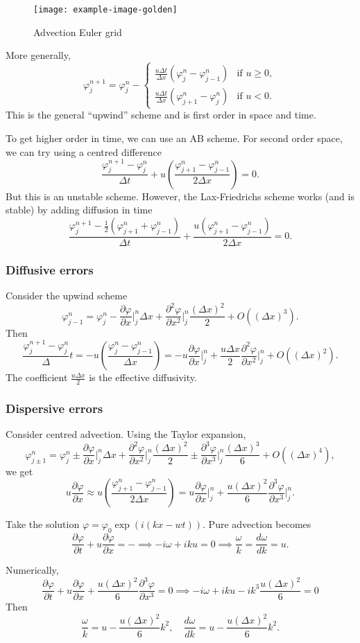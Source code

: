 \documentclass[11pt, a4paper]{article}
\renewcommand{\phi}{\varphi}
\theoremstyle{break}
\newcommand*{\Paren}[1]{\left(#1\right)}%
\newcommand{\dt}{\Delta t}
\newcommand{\dx}{\Delta x}
\newcommand{\der}[2]{\frac{\partial #1}{\partial #2}}
\newcommand{\pder}[3][2]{\frac{\partial^#1 #2}{\partial #3^#1}}
\newcommand{\dder}[2]{\frac{d #1}{d #2}}
\newcommand{\Eval}[1]{\bigg\rvert_{#1}}
\begin{document}
	\begin{figure}\centering
	\texttt{[image: example-image-golden]}
	\caption{Advection Euler grid}\label{fig:advectionEuler}
	\end{figure}
	
More generally, \[\phi_j^{n+1}=\phi_j^n-\begin{cases}
	\frac{u\dt}{\dx}(\phi_j^n-\phi_{j-1}^n)&\text{if }u\geq0,\\\frac{u\dt}{\dx}(\phi_{j+1}^n-\phi_j^n)&\text{if }u<0.
\end{cases}\] This is the general ``upwind'' scheme and is first order in space and time.

To get higher order in time, we can use an AB scheme. For second order space, we can try using a centred difference 
\[\frac{\phi_j^{n+1}-\phi_j^n}{\dt}+u\Paren{\frac{\phi^n_{j+1}-\phi^n_{j-1}}{2\dx}}=0.\] But this is an unstable scheme. However, the Lax-Friedrichs scheme works (and is stable) by adding diffusion in time \[\frac{\phi_j^{n+1}-\frac12(\phi_{j+1}^n+\phi_{j-1}^n)}{\dt}+{\frac{u(\phi^n_{j+1}-\phi^n_{j-1})}{2\dx}}=0.\]


\subsubsection{Diffusive errors}

Consider the upwind scheme\[\phi_{j-1}^n=\phi_j^n-\der\phi x\Eval j^n\dx+\pder\phi x\Eval j^n\frac{(\dx)^2}2+O((\dx)^3).\] Then \[\frac{\phi_j^{n+1}-\phi_j^n}\dt=-u\Paren{\frac{\phi_j^n-\phi_{j-1}^n}{\dx}}=-u\der\phi x\Eval j^n + \frac{u\dx}2\pder\phi x\Eval j^n + O((\dx)^2).\] The coefficient $\frac{u\dx}2$ is the effective diffusivity.

\subsubsection{Dispersive errors}

Consider centred advection. Using the Taylor expansion, \[\phi_{j\pm 1}^n=\phi_j^n\pm \der\phi x\Eval j^n\dx+\pder\phi x\Eval j^n\frac{(\dx)^2}2\pm \pder[3]\phi x\Eval j^n\frac{(\dx)^3}6+O((\dx)^4),\]
we get \[u\der\phi x \approx u\Paren{\frac{\phi_{j+1}^n-\phi_{j-1}^n}{2\dx}}=u\der\phi x\Eval j^n+\frac{u(\dx)^2}6\pder[3]\phi x\Eval j^n.\]

Take the solution $\phi=\phi_0\exp(i(kx-wt))$. Pure advection becomes \[\der\phi t+u\der\phi x=-\implies -i\omega+iku =0\implies \frac\omega k = \dder\omega k=u.\]

Numerically, \[\der\phi t+ u\der \phi x+\frac{u(\dx)^2}6\pder[3]\phi x=0\implies -i\omega+iku-ik^3\frac{u(\dx)^2}{6}=0\]
Then \[\frac{\omega}k=u-\frac{u(\dx)^2}{6}k^2,\quad \dder\omega k= u -\frac{u(\dx)^2}{6}k^2.\]
\end{document}
